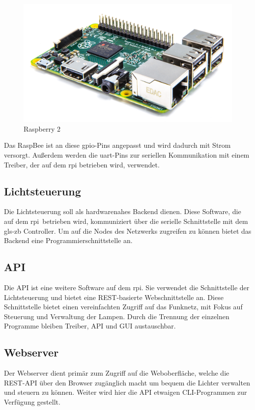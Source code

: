 \documentclass[a4paper,12pt]{article}
\begin{document}
\begin{figure}[h!]
	\centering
	\includegraphics[width=0.7\linewidth]{img/rpi2}
	\caption{Raspberry 2}
\end{figure}

\noindent
Das RaspBee ist an diese \acrshort{gpio}-Pins angepasst und wird dadurch mit
Strom versorgt. Außerdem werden die \acrshort{uart}-Pins zur seriellen
Kommunikation mit einem Treiber, der auf dem \gls{rpi} betrieben wird,
verwendet.

\subsection{Lichtsteuerung}

Die Lichtsteuerung soll als hardwarenahes Backend dienen. Diese Software, die
auf dem \gls{rpi} betrieben wird, kommuniziert über die serielle Schnittstelle
mit dem \gls{gls-zb} Controller. Um auf die Nodes des Netzwerks zugreifen zu
können bietet das Backend eine Programmierschnittstelle an.

\subsection{API}

Die API ist eine weitere Software auf dem \gls{rpi}. Sie verwendet die
Schnittstelle der Lichtsteuerung und bietet eine REST-basierte Webschnittstelle
an. Diese Schnittstelle bietet einen vereinfachten Zugriff auf das Funknetz,
mit Fokus auf Steuerung und Verwaltung der Lampen. Durch die Trennung der
einzelnen Programme bleiben Treiber, API und GUI austauschbar.

\subsection{Webserver}

Der Webserver dient primär zum Zugriff auf die Weboberfläche, welche die
REST-API über den Browser zugänglich macht um bequem die Lichter verwalten und
steuern zu können. Weiter wird hier die API etwaigen CLI-Programmen zur
Verfügung gestellt.
\end{document}
